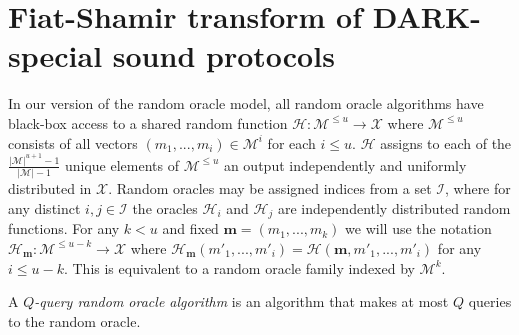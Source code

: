 \section{Fiat-Shamir transform of DARK-special sound protocols} 
\begin{definition}
	In our version of the random oracle model, all random oracle algorithms have black-box access to a shared random function $\mathcal{H}: \mathcal{M}^{\leq u} \rightarrow \mathcal{X}$ where $\mathcal{M}^{\leq u}$ consists of all vectors $(m_1,...,m_i) \in \mathcal{M}^i$ for each $i \leq u$. $\mathcal{H}$ assigns to each of the $\frac{|\mathcal{M}|^{u + 1} - 1}{|\mathcal{M}| - 1}$ unique elements of $\mathcal{M}^{\leq u}$ an output independently and uniformly distributed in $\mathcal{X}$. Random oracles may be assigned indices from a set $\mathcal{I}$, where for any distinct $i,j \in \mathcal{I}$ the oracles $\mathcal{H}_i$ and $\mathcal{H}_j$ are independently distributed random functions. For any $k < u$ and fixed $\mathbf{m} = (m_1,...,m_k)$ we will use the notation $\mathcal{H}_\mathbf{m}: \mathcal{M}^{\leq u - k} \rightarrow \mathcal{X}$ where $\mathcal{H}_\mathbf{m}(m'_1,...,m'_i) = \mathcal{H}(\mathbf{m}, m'_1,...,m'_i)$ for any $i \leq u - k$. This is equivalent to a random oracle family indexed by $\mathcal{M}^k$. 
\end{definition}
A \emph{$Q$-query random oracle algorithm} is an algorithm that makes at most $Q$ queries to the random oracle. 

